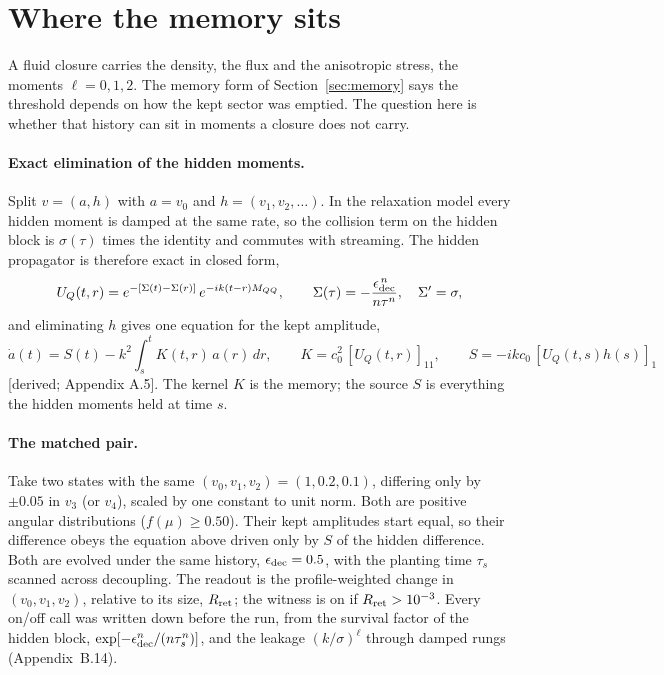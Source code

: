 \documentclass[11pt]{article}
\newcommand{\grade}[1]{\textsf{\small[#1]}}
\begin{document}
\section{Where the memory sits}\label{sec:witness}

A fluid closure carries the density, the flux and the anisotropic stress, the moments $\ell=0,1,2$. The memory form of Section~\ref{sec:memory} says the threshold depends on how the kept sector was emptied. The question here is whether that history can sit in moments a closure does not carry.

\paragraph{Exact elimination of the hidden moments.} Split $v=(a,h)$ with $a=v_0$ and $h=(v_1,v_2,\dots)$. In the relaxation model every hidden moment is damped at the same rate, so the collision term on the hidden block is $\sigma(\tau)$ times the identity and commutes with streaming. The hidden propagator is therefore exact in closed form,
\begin{equation}
U_Q(t,r)=e^{-[\Sigma(t)-\Sigma(r)]}\,e^{-ik(t-r)M_{QQ}},\qquad \Sigma(\tau)=-\frac{\epsilon_{\rm dec}^{\,n}}{n\tau^n},\quad \Sigma'=\sigma,
\end{equation}
and eliminating $h$ gives one equation for the kept amplitude,
\begin{equation}
\dot a(t)=S(t)-k^2\!\int_s^t K(t,r)\,a(r)\,dr,\qquad K=c_0^2\,[U_Q(t,r)]_{11},\qquad S=-ikc_0\,[U_Q(t,s)h(s)]_1
\end{equation}
\grade{derived; Appendix A.5}. The kernel $K$ is the memory; the source $S$ is everything the hidden moments held at time $s$.

\paragraph{The matched pair.} Take two states with the same $(v_0,v_1,v_2)=(1,0.2,0.1)$, differing only by $\pm0.05$ in $v_3$ (or $v_4$), scaled by one constant to unit norm. Both are positive angular distributions ($f(\mu)\ge0.50$). Their kept amplitudes start equal, so their difference obeys the equation above driven only by $S$ of the hidden difference. Both are evolved under the same history, $\epsilon_{\rm dec}=0.5$, with the planting time $\tau_s$ scanned across decoupling. The readout is the profile-weighted change in $(v_0,v_1,v_2)$, relative to its size, $R_{\rm ret}$; the witness is on if $R_{\rm ret}>10^{-3}$. Every on/off call was written down before the run, from the survival factor of the hidden block, $\exp[-\epsilon_{\rm dec}^n/(n\tau_s^n)]$, and the leakage $(k/\sigma)^\ell$ through damped rungs (Appendix~B.14).
\end{document}
